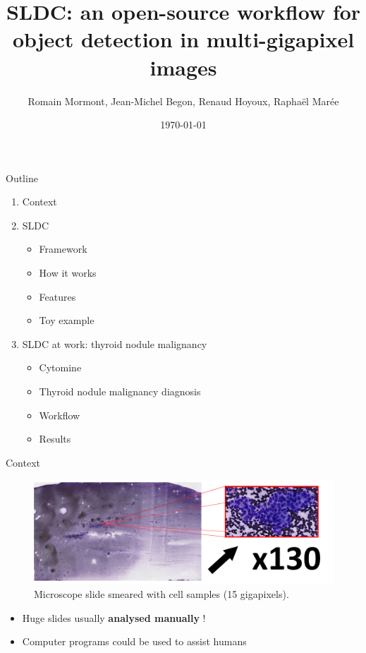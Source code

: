 \documentclass{beamer}
\title{{\bf SLDC: an open-source workflow for object detection in multi-gigapixel images}}
\author{Romain Mormont, Jean-Michel Begon, Renaud Hoyoux, Raphaël Marée}
\institute{Montefiore Institute, University of Liège, Belgium}
\date{\today}
\begin{document}


\begin{frame}
\titlepage
\end{frame}

\begin{frame}{Outline}

	\begin{enumerate}

		\item Context
		
		\item SLDC
		\begin{itemize}
			\item Framework
			\item How it works
			\item Features
			\item Toy example		
		\end{itemize}

		\item SLDC at work: thyroid nodule malignancy
		\begin{itemize}
			\item Cytomine
			\item Thyroid nodule malignancy diagnosis
			\item Workflow
			\item Results
		\end{itemize}
		
	\end{enumerate}

\end{frame}

\begin{frame}{Context}
	\vfill
	\begin{figure}[h]
	\center
	\includegraphics[scale=0.17]{images/whole-slide-dim.png}
	\caption{Microscope slide smeared with cell samples (15 gigapixels).}
	\end{figure}
	\vfill
	
	\begin{itemize}
		\item Huge slides usually \textbf{analysed manually} !
		\item Computer programs could be used to assist humans
	\end{itemize}
	
\end{frame}
\end{document}
